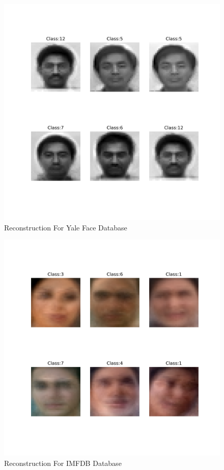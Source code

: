 \documentclass[12pt]{article}
\newenvironment{problem}[2][Problem]{\begin{trivlist}
\item[\hskip \labelsep {\bfseries #1}\hskip \labelsep {\bfseries #2.}]}{\end{trivlist}}
\begin{document}
\begin{problem}{1}
\begin{enumerate}[label=\alph*)]
		\begin{figure}[H]
			\centering
			\includegraphics[totalheight=8cm]{Reconstruction_For_Yale_Face_Database.png}
			\caption{Reconstruction For Yale Face Database}
			\label{fig:verticalcell}
		\end{figure}
		
		\begin{figure}[H]
			\centering
			\includegraphics[totalheight=8cm]{Reconstruction_For_IMFDB_Database.png}
			\caption{Reconstruction For IMFDB Database}
			\label{fig:verticalcell}
		\end{figure}
		

\end{enumerate}
\end{problem}
\end{document}
